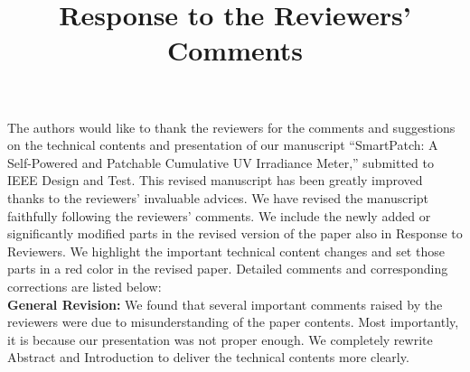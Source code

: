 \documentclass[onecolumn]{IEEEconf}
\title{Response to the Reviewers' Comments}
\begin{document}
\maketitle

The authors would like to thank the reviewers for the  comments and suggestions on the technical contents and presentation of our manuscript ``SmartPatch: A Self-Powered and Patchable Cumulative UV Irradiance Meter,'' submitted to IEEE Design and Test. This revised manuscript has been greatly improved thanks to the reviewers' invaluable advices. We have revised the manuscript faithfully following the reviewers' comments. We include the newly added or significantly modified parts in the revised version of the paper also in Response to Reviewers. We highlight the important technical content changes and set those parts in a red color in the revised paper. Detailed comments and corresponding corrections are listed below:\\

\setlength{\parindent}{0cm}
\textbf{General Revision:}
We found that several important comments raised by the reviewers were due to misunderstanding of the paper contents. Most importantly, it is because our presentation was not proper enough. We completely rewrite Abstract and Introduction to deliver the technical contents more clearly. \\
\end{document}
